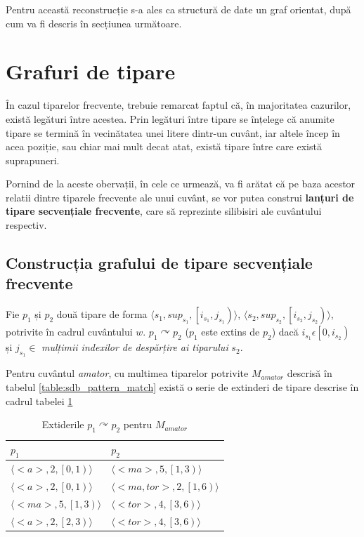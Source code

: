 Pentru această reconstrucție s-a ales ca structură de date un graf orientat, după cum va fi descris în secțiunea următoare.

\section{Grafuri de tipare}

În cazul tiparelor frecvente, trebuie remarcat faptul că, în majoritatea cazurilor, există legături între acestea. Prin legături între tipare se înțelege că anumite tipare se termină în vecinătatea unei litere dintr-un cuvânt, iar altele încep în acea poziție, sau chiar mai mult decat atat, există tipare între care există suprapuneri. 

Pornind de la aceste obervații, în cele ce urmează, va fi arătat că pe baza acestor relatii dintre tiparele frecvente ale unui cuvânt, se vor putea construi \textbf{lanțuri de tipare secvențiale frecvente}, care să reprezinte silibisiri ale cuvântului respectiv.

\subsection{Construcția grafului de tipare secvențiale frecvente}
\begin{defi}
Fie $p_1$ și $p_2$ două tipare de forma  $\langle s_1,sup_{s_1}, \left[i_{s_1},j_{s_1}\right) \rangle$, $\langle s_2,sup_{s_2}, \left[i_{s_2},j_{s_2}\right)\rangle $, potrivite în cadrul cuvântului $w$. $p_1 \curvearrowright p_2$ ($p_1$ este extins de $p_2$) dacă $i_{s_1} \epsilon \left[0, i_{s_2}\right)$ și $j_{s_1}\in $ \textit{mulțimii indexilor de despărțire ai tiparului} $s_2$. 
\end{defi}

\begin{ex}
Pentru cuvântul \textit{amator}, cu multimea tiparelor potrivite $M_{amator}$ descrisă în tabelul \ref{table:sdb_pattern_match} există o serie de extinderi de tipare descrise în cadrul tabelei \ref{table:sdb_pattern_extensions}
\end{ex}

\begin{table}[h!]
\centering    
\begin{tabular}{|l|l|}    
\hline      
$p_1$ & $p_2$\\
\hline
$\langle<a>, 2, \left[0,1\right)\rangle$ & $\langle<ma>, 5, \left[1,3\right)\rangle$  \\
$\langle<a>, 2, \left[0,1\right)\rangle$ & $\langle<ma,tor>, 2, \left[1,6\right)\rangle$  \\
$\langle<ma>, 5, \left[1,3\right)\rangle$ & $\langle<tor>, 4, \left[3,6\right)\rangle$  \\
$\langle<a>, 2, \left[2,3\right)\rangle$ & $\langle<tor>, 4, \left[3,6\right)\rangle$  \\
\hline
\end{tabular}
\caption{Extiderile $p_1 \curvearrowright p_2$ pentru $M_{amator}$}
\label{table:sdb_pattern_extensions}               
\end{table}  

